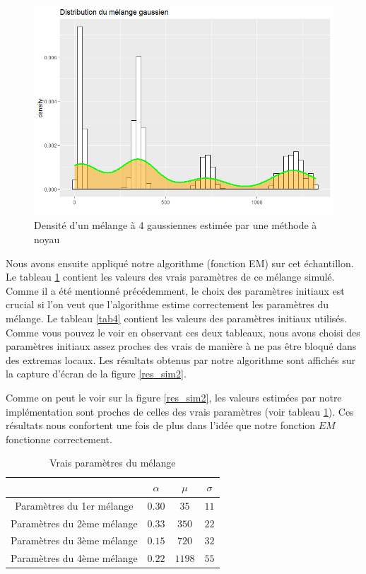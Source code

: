 \documentclass[a4paper,french,10pt]{article}
\begin{document}
\begin{figure}[htp] 
	\centering
	\includegraphics[scale=0.5]{images/dens_sim2.png}
	\caption{Densité d'un mélange à 4 gaussiennes estimée par une méthode à noyau}
	\label{density_sim2}
\end{figure}

Nous avons ensuite appliqué notre algorithme (fonction EM) sur cet échantillon. Le tableau \ref{tab3} contient les valeurs des vrais paramètres de ce mélange simulé. Comme il a été mentionné précédemment, le choix des paramètres initiaux est crucial si l'on veut que l'algorithme estime correctement les paramètres du mélange. Le tableau \ref{tab4} contient les valeurs des paramètres initiaux utilisés. Comme vous pouvez le voir en observant ces deux tableaux, nous avons choisi des paramètres initiaux assez proches des vrais de manière à ne pas être bloqué dans des extremas locaux. Les résultats obtenus par notre algorithme sont affichés sur la capture d'écran de la figure \ref{res_sim2}.

Comme on peut le voir sur la figure \ref{res_sim2}, les valeurs estimées par notre implémentation sont proches de celles des vrais paramètres (voir tableau \ref{tab3}). Ces résultats nous confortent une fois de plus dans l'idée que notre fonction $EM$ fonctionne correctement.

\begin{table}[htp]
	\center
	\begin{tabular}{|c||c|c|c|}
		\hline
		& $\alpha$ & $\mu$ & $\sigma$\\
		\hline
		Paramètres du 1er mélange & $0.30$ & $35$ & $11$ \\
		\hline
		Paramètres du 2ème mélange & $0.33$ & $350$ & $22$ \\
		\hline
		Paramètres du 3ème mélange & $0.15$ & $720$ & $32$ \\
		\hline
		Paramètres du 4ème mélange & $0.22$ & $1198$ & $55$ \\
		\hline
	\end{tabular}
	\caption{Vrais paramètres du mélange}
	\label{tab3}
\end{table}
\end{document}
